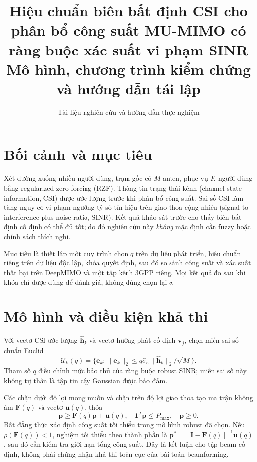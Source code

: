 \documentclass[11pt,onecolumn]{IEEEtran}
\title{Hiệu chuẩn biên bất định CSI cho phân bổ công suất MU-MIMO có ràng buộc xác suất vi phạm SINR\\\large Mô hình, chương trình kiểm chứng và hướng dẫn tái lập}
\author{Tài liệu nghiên cứu và hướng dẫn thực nghiệm}
\begin{document}
\maketitle
\section{Bối cảnh và mục tiêu}
Xét đường xuống nhiều người dùng, trạm gốc có $M$ anten, phục vụ $K$ người dùng bằng regularized zero-forcing (RZF). Thông tin trạng thái kênh (channel state information, CSI) được ước lượng trước khi phân bổ công suất. Sai số CSI làm tăng nguy cơ vi phạm ngưỡng tỷ số tín hiệu trên giao thoa cộng nhiễu (signal-to-interference-plus-noise ratio, SINR). Kết quả khảo sát trước cho thấy biên bất định cố định có thể đủ tốt; do đó nghiên cứu này \emph{không} mặc định cần fuzzy hoặc chính sách thích nghi.

Mục tiêu là thiết lập một quy trình chọn $q$ trên dữ liệu phát triển, hiệu chuẩn riêng trên dữ liệu độc lập, khóa quyết định, sau đó so sánh công suất và xác suất thất bại trên DeepMIMO và một tập kênh 3GPP riêng. Mọi kết quả đo sau khi khóa chỉ được dùng để đánh giá, không dùng chọn lại $q$.

\section{Mô hình và điều kiện khả thi}
Với vectơ CSI ước lượng $\widehat{\mathbf h}_k$ và vectơ hướng phát cố định $\mathbf v_j$, chọn miền sai số chuẩn Euclid
\begin{equation}
\mathcal U_k(q)=\{\mathbf e_k:\|\mathbf e_k\|_2\le q\widehat\sigma_e\|\widehat{\mathbf h}_k\|_2/\sqrt M\}.
\end{equation}
Tham số $q$ điều chỉnh mức bảo thủ của ràng buộc robust SINR; miền sai số này không tự thân là tập tin cậy Gaussian được bảo đảm.

Các chặn dưới độ lợi mong muốn và chặn trên độ lợi giao thoa tạo ma trận không âm $\mathbf F(q)$ và vectơ $\mathbf u(q)$, thỏa
\begin{equation}
\mathbf p\ge\mathbf F(q)\mathbf p+\mathbf u(q),\quad \mathbf 1^T\mathbf p\le P_{\max},\quad \mathbf p\ge0.
\end{equation}
Bất đẳng thức xác định công suất tối thiểu trong mô hình robust đã chọn. Nếu $\rho(\mathbf F(q))<1$, nghiệm tối thiểu theo thành phần là $\mathbf p^*=[\mathbf I-\mathbf F(q)]^{-1}\mathbf u(q)$, sau đó cần kiểm tra giới hạn tổng công suất. Đây là kết luận cho tập beam cố định, không phải chứng nhận khả thi toàn cục của bài toán beamforming.
\end{document}
